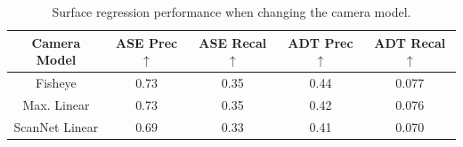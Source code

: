 \begin{table}[]
    \centering
    \begin{tabular}{c|c|c|c|c}
         Camera Model & ASE Prec $\uparrow$ & ASE Recal $\uparrow$ & ADT Prec $\uparrow$ & ADT Recal $\uparrow$ \\ \hline \hline
         Fisheye & 0.73 & 0.35 & 0.44 & 0.077 \\ \hline
         Max. Linear & 0.73 & 0.35 & 0.42 & 0.076 \\ \hline
         ScanNet Linear & 0.69 & 0.33 & 0.41 & 0.070 \\ \hline
        
    \end{tabular}
    \caption{\EVL{} Surface regression performance when changing the camera model.}
    \label{tab:surf_cam_ablation}
\end{table}